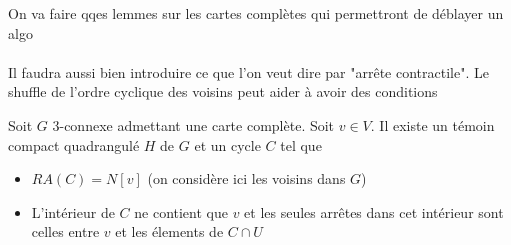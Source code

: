 \documentclass{scrartcl}
\begin{document}
\begin{flushleft}
On va faire qqes lemmes sur les cartes complètes qui permettront de déblayer un algo
\\~\\
Il faudra aussi bien introduire ce que l'on veut dire par "arrête contractile". Le shuffle de l'ordre cyclique des voisins
peut aider à avoir des conditions

\begin{prop}\label{cyclSep}
    Soit $G$ $3$-connexe admettant une carte complète. Soit $v \in V$. Il existe un témoin compact quadrangulé $H$ de $G$ et
    un cycle $C$ tel que
    \begin{itemize}
        \item $RA(C) = N[v]$ (on considère ici les voisins dans $G$)
        \item L'intérieur de $C$ ne contient que $v$ et les seules arrêtes dans cet intérieur sont celles entre $v$ et
        les élements de $C \cap U$
    \end{itemize}
\end{prop}


\end{flushleft}
\end{document}

